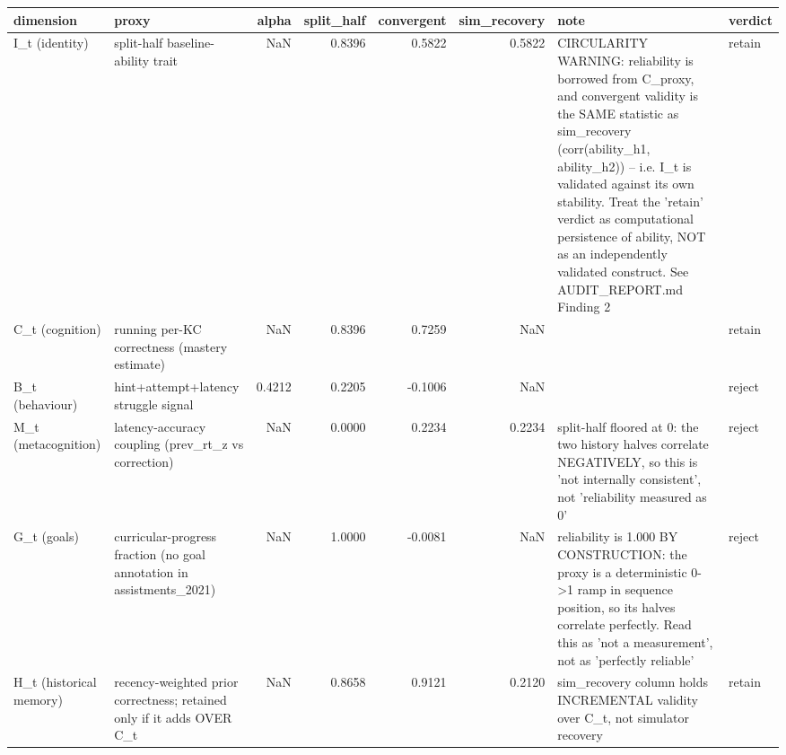 \begin{tabular}{llrrrrll}
\toprule
dimension & proxy & alpha & split\_half & convergent & sim\_recovery & note & verdict \\
\midrule
I\_t (identity) & split-half baseline-ability trait & NaN & 0.8396 & 0.5822 & 0.5822 & CIRCULARITY WARNING: reliability is borrowed from C\_proxy, and convergent validity is the SAME statistic as sim\_recovery (corr(ability\_h1, ability\_h2)) -- i.e. I\_t is validated against its own stability. Treat the 'retain' verdict as computational persistence of ability, NOT as an independently validated construct. See AUDIT\_REPORT.md Finding 2 & retain \\
C\_t (cognition) & running per-KC correctness (mastery estimate) & NaN & 0.8396 & 0.7259 & NaN &  & retain \\
B\_t (behaviour) & hint+attempt+latency struggle signal & 0.4212 & 0.2205 & -0.1006 & NaN &  & reject \\
M\_t (metacognition) & latency-accuracy coupling (prev\_rt\_z vs correction) & NaN & 0.0000 & 0.2234 & 0.2234 & split-half floored at 0: the two history halves correlate NEGATIVELY, so this is 'not internally consistent', not 'reliability measured as 0' & reject \\
G\_t (goals) & curricular-progress fraction (no goal annotation in assistments\_2021) & NaN & 1.0000 & -0.0081 & NaN & reliability is 1.000 BY CONSTRUCTION: the proxy is a deterministic 0->1 ramp in sequence position, so its halves correlate perfectly. Read this as 'not a measurement', not as 'perfectly reliable' & reject \\
H\_t (historical memory) & recency-weighted prior correctness; retained only if it adds OVER C\_t & NaN & 0.8658 & 0.9121 & 0.2120 & sim\_recovery column holds INCREMENTAL validity over C\_t, not simulator recovery & retain \\
\bottomrule
\end{tabular}
